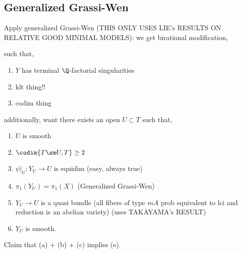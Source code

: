 \documentclass[12pt]{article}
\begin{document}
\subsection{Generalized Grassi-Wen}

Apply generalized Grassi-Wen (THIS ONLY USES LIE's RESULTS ON RELATIVE GOOD MINIMAL MODELS): we get birational modification,
\begin{center}
\end{center} 
such that,
\begin{enumerate}
\item $Y$ has terminal $\Q$-factorial singularities
\item klt thing!!
\item codim thing
\end{enumerate}
additionally, want there exists an open $U \subset T$ such that,
\begin{enumerate}
\item $U$ is smooth

\item  $\codim{T \sm U, T} \ge 2$

\item $\psi|_U : Y_U \to U$ is equidim (easy, always true)

\item $\pi_1(Y_U) = \pi_1(X)$ (Generalized Grassi-Wen)

\item $Y_U \to U$ is a quasi bundle (all fibers of type $m A$ prob equivalent to lci and reduction is an abelian variety) (uses TAKAYAMA's RESULT) 

\item $Y_U$ is smooth.
\end{enumerate}

Claim that (a) + (b) + (c) implies (e). 
\end{document}

